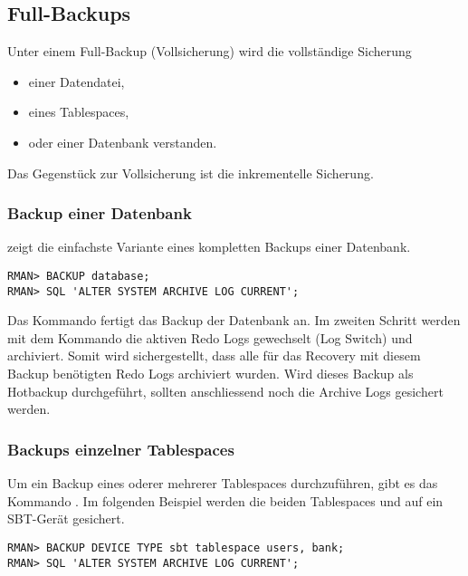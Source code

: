       \subsection{Full-Backups}
        Unter einem Full-Backup (Vollsicherung) wird die vollst\"andige Sicherung
        \begin{itemize}
          \item einer Datendatei,
          \item eines Tablespaces,
          \item oder einer Datenbank verstanden.
        \end{itemize}
        Das Gegenst\"uck zur Vollsicherung ist die inkrementelle Sicherung.
        \subsubsection{Backup einer Datenbank}
           zeigt die einfachste Variante eines kompletten Backups einer Datenbank.
          \begin{lstlisting}[caption={Backup einer ganzen Datenbank},label=admin1309,language=rman,emph={[9]ALTER,SYSTEM,ARCHIVE,LOG,CURRENT},emphstyle={[9]\color{magenta}\bfseries}]
RMAN> BACKUP database;
RMAN> SQL 'ALTER SYSTEM ARCHIVE LOG CURRENT';
          \end{lstlisting}
          Das Kommando  fertigt das Backup der Datenbank an. Im zweiten Schritt werden mit dem Kommando  die aktiven Redo Logs gewechselt (Log Switch) und archiviert. Somit wird sichergestellt, dass alle f\"ur das Recovery mit diesem Backup ben\"otigten Redo Logs archiviert wurden. Wird dieses Backup als Hotbackup durchgef\"uhrt, sollten anschliessend noch die Archive Logs gesichert werden.
        \subsubsection{Backups einzelner Tablespaces}
          Um ein Backup eines oderer mehrerer Tablespaces durchzuf\"uhren, gibt es das Kommando . Im folgenden Beispiel werden die beiden Tablespaces  und  auf ein SBT-Ger\"at gesichert.
          \begin{lstlisting}[caption={Backup eines Tablespace},label=admin1310,language=rman,emph={[9]ALTER,SYSTEM,ARCHIVE,LOG,CURRENT},emphstyle={[9]\color{magenta}\bfseries}]
RMAN> BACKUP DEVICE TYPE sbt tablespace users, bank;
RMAN> SQL 'ALTER SYSTEM ARCHIVE LOG CURRENT';
          \end{lstlisting}
